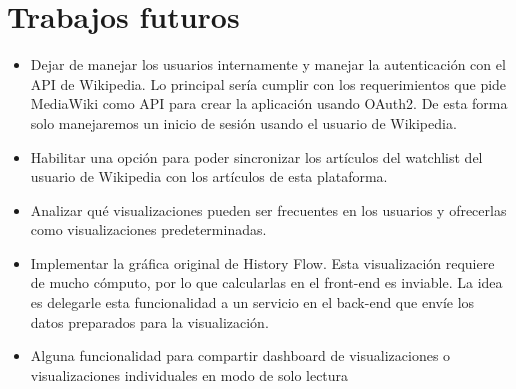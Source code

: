 \section{Trabajos futuros}

\begin{itemize}
    \item Dejar de manejar los usuarios internamente y manejar la autenticación con el API de Wikipedia. Lo principal sería cumplir con los requerimientos que pide MediaWiki como API para crear la aplicación usando OAuth2. De esta forma solo manejaremos un inicio de sesión usando el usuario de Wikipedia.
    
    \item Habilitar una opción para poder sincronizar los artículos del watchlist del usuario de Wikipedia con los artículos de esta plataforma.
    
    \item Analizar qué visualizaciones pueden ser frecuentes en los usuarios y ofrecerlas como visualizaciones predeterminadas.
    
    \item Implementar la gráfica original de History Flow. Esta visualización requiere de mucho cómputo, por lo que calcularlas en el front-end es inviable. La idea es delegarle esta funcionalidad a un servicio en el back-end que envíe los datos preparados para la visualización.
    
    \item Alguna funcionalidad para compartir dashboard de visualizaciones o visualizaciones individuales en modo de solo lectura
\end{itemize}